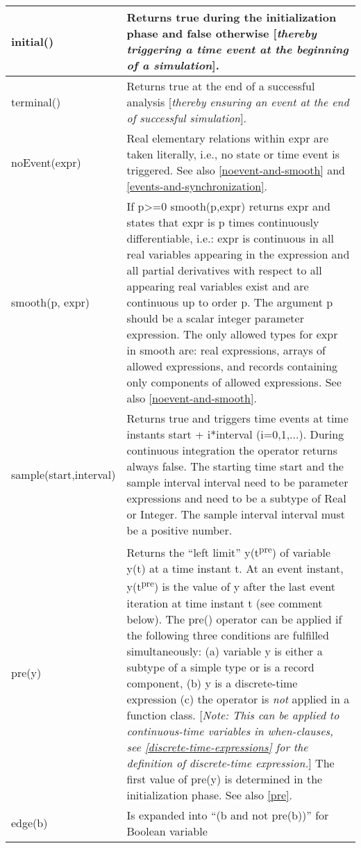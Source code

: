 \begin{longtable}{|p{5cm}|p{8cm}|} 
\hline \endhead
initial() & Returns true during the initialization phase and false
otherwise {[}\emph{thereby triggering a time event at the beginning of a
simulation}{]}.\\ \hline
terminal() & Returns true at the end of a successful analysis
{[}\emph{thereby ensuring an event at the end of successful
simulation}{]}.\\ \hline
noEvent(expr) & Real elementary relations within expr are taken
literally, i.e., no state or time event is triggered. See also \autoref{noevent-and-smooth} and \autoref{events-and-synchronization}.\\ \hline
smooth(p, expr) & If p\textgreater{}=0 smooth(p,expr)
returns expr and states that expr is p times continuously
differentiable, i.e.: expr is continuous in all real variables appearing
in the expression and all partial derivatives with respect to all
appearing real variables exist and are continuous up to order
p. The argument p should be a scalar integer parameter
expression. The only allowed types for expr in smooth are: real
expressions, arrays of allowed expressions, and records containing only
components of allowed expressions. See also \autoref{noevent-and-smooth}.\\ \hline
sample(start,interval) & Returns true and triggers time events at time
instants start + i*interval (i=0,1,...). During continuous integration
the operator returns always false. The starting time start and the
sample interval interval need to be parameter expressions and need to be
a subtype of Real or Integer. The sample interval interval must be a
positive number.\\ \hline
pre(y) & Returns the ``left limit'' y(t\textsuperscript{pre}) of
variable y(t) at a time instant t. At an event instant,
y(t\textsuperscript{pre}) is the value of y after the last event
iteration at time instant t (see comment below). The pre() operator can
be applied if the following three conditions are fulfilled
simultaneously: (a) variable y is either a subtype of a simple type or
is a record component, (b) y is a discrete-time expression (c) the
operator is \emph{not} applied in a function class. {[}\emph{Note: This
can be applied to continuous-time variables in when-clauses, see
\autoref{discrete-time-expressions} for the definition of discrete-time expression.}{]}
The first value of pre(y) is determined in the initialization phase. See
also \autoref{pre}.\\ \hline
edge(b) & Is expanded into ``(b and not pre(b))'' for Boolean variable

\end{longtable}
